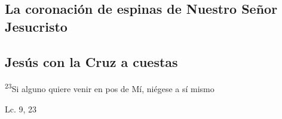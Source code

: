 \documentclass[a4paper,11pt]{article}
\begin{document}
      
      \medskip

      
      \medskip

      
      \medskip

      
      \medskip

      
      \medskip
      
    \subsection*{\hfil La coronación de espinas de Nuestro Señor Jesucristo \hfil}
      
      
      \medskip

      
      \medskip

      
      \medskip

      
      \medskip

      
      \medskip

      
      \medskip

      
      \medskip

      
      \medskip

      
      \medskip

      
      \medskip

    \subsection*{\hfil Jesús con la Cruz a cuestas \hfil}
      
      
      \textsuperscript{23}Si alguno quiere venir en pos de Mí, niégese a sí mismo
      \begin{flushright}
        Lc. 9, 23
      \end{flushright}
\end{document}
